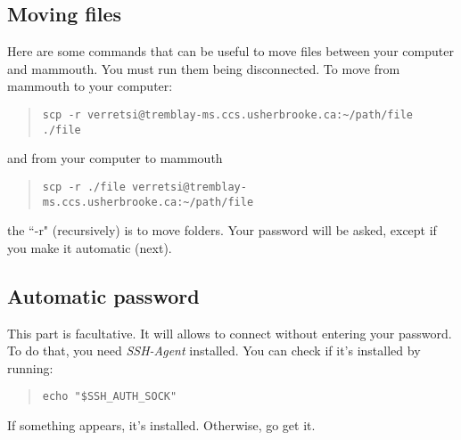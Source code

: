 \documentclass[10pt,letter]{article}
\begin{document}
\subsection{Moving files}
Here are some commands that can be useful to move files between your computer and mammouth. You must run them being disconnected. To move from mammouth to your computer:
\begin{quote}
\begin{verbatim}
scp -r verretsi@tremblay-ms.ccs.usherbrooke.ca:~/path/file ./file
\end{verbatim}
\end{quote}
and from your computer to mammouth
\begin{quote}
\begin{verbatim}
scp -r ./file verretsi@tremblay-ms.ccs.usherbrooke.ca:~/path/file
\end{verbatim}
\end{quote}
the ``-r" (recursively) is to move folders. Your password will be asked, except if you make it automatic (next).



\subsection{Automatic password}
This part is facultative. It will allows to connect without entering your password. To do that, you need \emph{SSH-Agent} installed. You can check if it's installed by running:
\begin{quote}
\begin{verbatim}
echo "$SSH_AUTH_SOCK"
\end{verbatim}
\end{quote}
If something appears, it's installed. Otherwise, go get it. 
\end{document}
